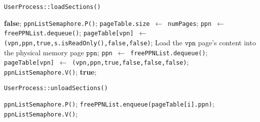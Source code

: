 \documentclass{article}
\begin{document}
\begin{spacing}{1.1}
\begin{algorithm}[htbp]
  \caption{\texttt{UserProcess::loadSections()}}
  \begin{algorithmic}[1]
    \RETURN \textbf{false};
    \ENDIF
    \STATE \texttt{ppnListSemaphore.P()};
    \STATE \texttt{pageTable.size $\gets$ numPages};
    \STATE \texttt{ppn $\gets$ freePPNList.dequeue()};
    \STATE \texttt{pageTable[vpn] $\gets$ (vpn,ppn,true,s.isReadOnly(),false,false)};
    \STATE Load the $\texttt{vpn}$ page's content into the physical memory page $\texttt{ppn}$;
    \ENDFOR
    \STATE \texttt{ppn $\gets$ freePPNList.dequeue()};
    \STATE \texttt{pageTable[vpn] $\gets$ (vpn,ppn,true,false,false,false)};
    \ENDFOR
    \STATE \texttt{ppnListSemaphore.V()};
    \RETURN \textbf{true};
  \end{algorithmic}
\end{algorithm}

\begin{algorithm}[htbp]
  \caption{\texttt{UserProcess::unloadSections()}}
  \begin{algorithmic}[1]
    \STATE \texttt{ppnListSemaphore.P()};
    \STATE \texttt{freePPNList.enqueue(pageTable[i].ppn)};
    \ENDFOR
    \STATE \texttt{ppnListSemaphore.V()};
  \end{algorithmic}
\end{algorithm}


\end{spacing}
\end{document}

